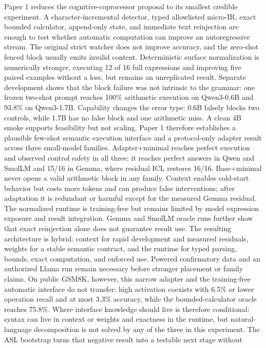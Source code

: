 \documentclass[11pt]{article}
\begin{document}
Paper 1 reduces the cognitive-coprocessor proposal to its smallest credible
experiment. A character-incremental detector, typed allowlisted micro-IR, exact
bounded calculator, append-only state, and immediate text reinjection are enough
to test whether automatic computation can improve an autoregressive stream.
The original strict watcher does not improve accuracy, and the zero-shot fenced
block usually emits invalid content. Deterministic surface normalization is
numerically stronger, executing 12 of 16 full expressions and improving five
paired examples without a loss, but remains an unreplicated result. Separate
development shows that the block failure was not intrinsic to the grammar: one
frozen two-shot prompt reaches 100\% arithmetic execution on Qwen3-0.6B and
93.8\% on Qwen3-1.7B. Capability changes the error type: 0.6B falsely blocks two
controls, while 1.7B has no false block and one arithmetic miss. A clean 4B smoke
supports feasibility but not scaling. Paper 1 therefore establishes a plausible
few-shot semantic execution interface and a protocol-only adapter result across
three small-model families. Adapter+minimal reaches perfect execution and observed
control safety in all three; it reaches perfect answers in Qwen and SmolLM and
15/16 in Gemma, where residual ICL restores 16/16. Base+minimal never opens a
valid arithmetic block in any family. Context enables cold-start behavior but
costs more tokens and can produce false interventions; after adaptation it is
redundant or harmful except for the measured Gemma residual. The normalized
runtime is training-free but remains limited by model expression exposure and
result integration. Gemma and SmolLM oracle runs further show that exact
reinjection alone does not guarantee result use. The resulting architecture is
hybrid: context for rapid development and measured residuals, weights for a
stable semantic contract, and the runtime for typed parsing, bounds, exact
computation, and enforced use. Powered confirmatory data and an authorized Llama
run remain necessary before stronger placement or family claims. On public
GSM8K, however, this narrow adapter and the training-free automatic interface do
not transfer: high activation coexists with 6.5\% or lower operation recall and
at most 3.3\% accuracy, while the bounded-calculator oracle reaches 75.8\%.
Where interface knowledge should live is therefore conditional: syntax can live
in context or weights and exactness in the runtime, but natural-language
decomposition is not solved by any of the three in this experiment.
The ASL bootstrap turns that negative result into a testable next stage without
\end{document}

